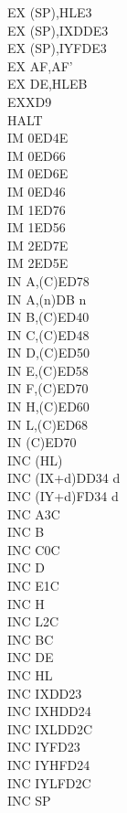 \documentclass[12pt,twoside,openright,a4paper]{book}
\begin{document}
\begin{multicols}{3}
{\begin{tabbing}
		EX (SP),HL\>E3\\
		EX (SP),IX\>DDE3\\
		EX (SP),IY\>FDE3\\
		EX AF,AF'\\
		EX DE,HL\>EB\\
		EXX\>D9\\
		HALT\\
		IM 0\UNDOC\>ED4E\\
		IM 0\UNDOC\>ED66\\
		IM 0\UNDOC\>ED6E\\
		IM 0\>ED46\\
		IM 1\UNDOC\>ED76\\
		IM 1\>ED56\\
		IM 2\UNDOC\>ED7E\\
		IM 2\>ED5E\\
		IN A,(C)\>ED78\\
		IN A,(n)\>DB n\\
		IN B,(C)\>ED40\\
		IN C,(C)\>ED48\\
		IN D,(C)\>ED50\\
		IN E,(C)\>ED58\\
		IN F,(C)\UNDOC\>ED70\\
		IN H,(C)\>ED60\\
		IN L,(C)\>ED68\\
		IN (C)\UNDOC\>ED70\\
		INC (HL)\\
		INC (IX+d)\>DD34 d\\
		INC (IY+d)\>FD34 d\\
		INC A\>3C\\
		INC B\\
		INC C\>0C\\
		INC D\\
		INC E\>1C\\
		INC H\\
		INC L\>2C\\
		INC BC\\
		INC DE\\
		INC HL\\
		INC IX\>DD23\\
		INC IXH\UNDOC\>DD24\\
		INC IXL\UNDOC\>DD2C\\
		INC IY\>FD23\\
		INC IYH\UNDOC\>FD24\\
		INC IYL\UNDOC\>FD2C\\
		INC SP\\

\end{tabbing}}
\end{multicols}
\end{document}
